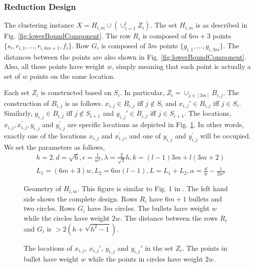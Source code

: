 \documentclass{article}
\begin{document}
\subsubsection{Reduction Design}
The clustering instance $X = H_{l,m} \cup (\cup_{i=1}^l Z_i)$. The set $H_{l,m}$ is as described in Fig. \ref{fig:lowerBoundComponent}. The row $R_i$ is composed of $6m + 3$ points $\{s_i, r_{i, 1}, \ldots, r_{i, 6m+1}, f_i\}$. Row $G_i$ is composed of $3m$ points $\{g_{i,1}, \ldots, g_{i, 3m}\}$. The distances between the points are also shown in Fig. \ref{fig:lowerBoundComponent}. Also, all these points have weight $w$, simply meaning that each point is actually a set of $w$ points on the same location.

Each set $Z_i$ is constructed based on $S_i$. In particular, $Z_i = \cup_{j\in [3m]} B_{i,j}$. The construction of $B_{i,j}$ is as follows. $x_{i,j} \in B_{i,j}$ iff $j \not\in S_i$ and $x_{i,j}' \in B_{i,j}$ iff $j \in S_i$. Similarly,  $y_{i,j} \in B_{i,j}$ iff $j \not\in S_{i+1}$ and $y_{i,j}' \in B_{i,j}$ iff $j \in S_{i+1}$. The locations, $x_{i, j}, x_{i,j}^\prime, y_{i,j}$ and $y_{i, j}^\prime$ are specific locations as depicted in Fig. \ref{fig:ZFig}. In other words, exactly one of the locations $x_{i,j}$ and $x_{i,j}^\prime$, and one of $y_{i,j}$ and $y_{i,j}^\prime$ will be occupied. We set the parameters as follows, 
\vspace{-0.1in}
\begin{align*}
&h = 2, d = \sqrt{6}, \epsilon = \frac{1}{w^2}, \lambda = \frac{2}{\sqrt{3}}h, k = (l-1)3m + l(3m+2)\\
& L_1 = (6m+3)w, L_2 = 6m(l-1), L = L_1 + L_2, \alpha = \frac{d}{w}-\frac{1}{2w^3}
\end{align*}


  \begin{figure}[!tbp]
  \centering
  \begin{minipage}[b]{0.49\textwidth}
    \resizebox{\linewidth}{!}{}
    \caption{Geometry of $H_{l,m}$. This figure is similar to Fig. 1 in \cite{vattani2009hardness}. The left hand side shows the complete design. Rows $R_i$ have $6m+1$ bullets and two circles. Rows $G_i$ have $3m$ circles. The bullets have weight $w$ while the circles have weight $2w$. The distance between the rows $R_i$ and $G_i$ is $> 2(h+\sqrt{h^2-1})$.}
    \label{fig:lowerBoundComponent}
  \end{minipage}
  \hfill
  \begin{minipage}[b]{0.49\textwidth}
    
    \caption{The locations of $x_{i,j}$, $x_{i,j}'$, $y_{i,j}$ and $y_{i,j}'$ in the set $Z_i$. The points in bullet have weight $w$ while the points in circles have weight $2w$.}
    \label{fig:ZFig}
  \end{minipage}
\end{figure}
\end{document}
